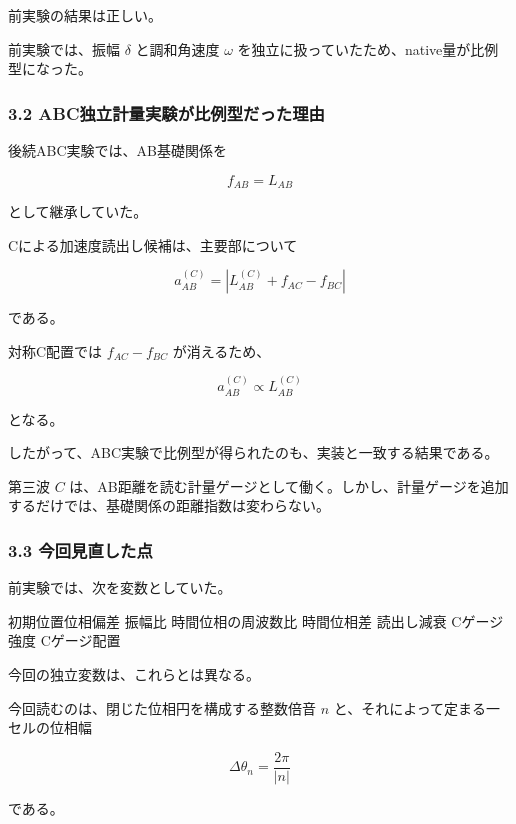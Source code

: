 \documentclass[
  a4paper,
]{ltjsarticle}
\newenvironment{Shaded}{}{}
\newcommand{\NormalTok}[1]{#1}
\begin{document}
前実験の結果は正しい。

前実験では、振幅 \(\delta\) と調和角速度 \(\omega\)
を独立に扱っていたため、native量が比例型になった。

\subsubsection{3.2
ABC独立計量実験が比例型だった理由}\label{abcux72ecux7acbux8a08ux91cfux5b9fux9a13ux304cux6bd4ux4f8bux578bux3060ux3063ux305fux7406ux7531}

後続ABC実験では、AB基礎関係を

\[
f_{AB}=L_{AB}
\]

として継承していた。

Cによる加速度読出し候補は、主要部について

\[
a_{AB}^{(C)}
=\left|L_{AB}^{(C)}+f_{AC}-f_{BC}\right|
\]

である。

対称C配置では \(f_{AC}-f_{BC}\) が消えるため、

\[
a_{AB}^{(C)}\propto L_{AB}^{(C)}
\]

となる。

したがって、ABC実験で比例型が得られたのも、実装と一致する結果である。

第三波 \(C\)
は、AB距離を読む計量ゲージとして働く。しかし、計量ゲージを追加するだけでは、基礎関係の距離指数は変わらない。

\subsubsection{3.3
今回見直した点}\label{ux4ecaux56deux898bux76f4ux3057ux305fux70b9}

前実験では、次を変数としていた。

\begin{Shaded}
\begin{Highlighting}[]
\NormalTok{初期位置位相偏差}
\NormalTok{振幅比}
\NormalTok{時間位相の周波数比}
\NormalTok{時間位相差}
\NormalTok{読出し減衰}
\NormalTok{Cゲージ強度}
\NormalTok{Cゲージ配置}
\end{Highlighting}
\end{Shaded}

今回の独立変数は、これらとは異なる。

今回読むのは、閉じた位相円を構成する整数倍音 \(n\)
と、それによって定まる一セルの位相幅

\[
\Delta\theta_n=\frac{2\pi}{|n|}
\]

である。
\end{document}
